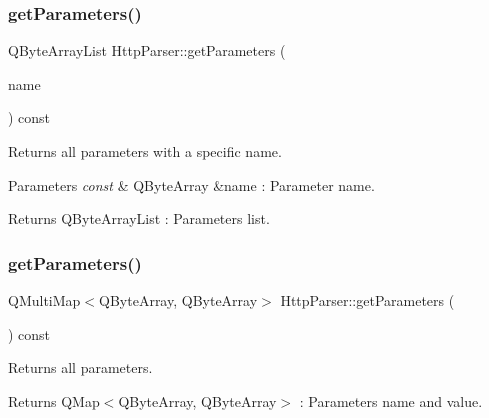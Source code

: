 \subsubsection{\texorpdfstring{get\+Parameters()}{getParameters()}\hspace{0.1cm}{\footnotesize\ttfamily [1/2]}}
{\footnotesize\ttfamily Q\+Byte\+Array\+List Http\+Parser\+::get\+Parameters (\begin{DoxyParamCaption}\item[{const Q\+Byte\+Array \&}]{name }\end{DoxyParamCaption}) const\hspace{0.3cm}{\ttfamily [inline]}}



Returns all parameters with a specific name. 


\begin{DoxyParams}{Parameters}
{\em const} & Q\+Byte\+Array \&name \+: Parameter name. \\
\hline
\end{DoxyParams}
\begin{DoxyReturn}{Returns}
Q\+Byte\+Array\+List \+: Parameters list. 
\end{DoxyReturn}
\mbox{\label{class_http_parser_ae01f9d2a2d1788c0c74fc0a9fa447178}} 
\subsubsection{\texorpdfstring{get\+Parameters()}{getParameters()}\hspace{0.1cm}{\footnotesize\ttfamily [2/2]}}
{\footnotesize\ttfamily Q\+Multi\+Map$<$Q\+Byte\+Array, Q\+Byte\+Array$>$ Http\+Parser\+::get\+Parameters (\begin{DoxyParamCaption}{ }\end{DoxyParamCaption}) const\hspace{0.3cm}{\ttfamily [inline]}}



Returns all parameters. 

\begin{DoxyReturn}{Returns}
Q\+Map$<$\+Q\+Byte\+Array, Q\+Byte\+Array$>$ \+: Parameters name and value. 
\end{DoxyReturn}
\mbox{\label{class_http_parser_aba65276efdd7ccfd93ff03f29f80889f}} 

